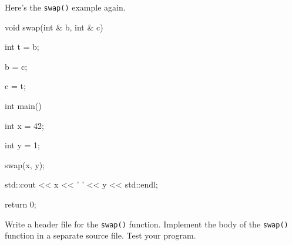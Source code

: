 Here's the \texttt{swap()} example again.



\begin{consolethree}[escapeinside=||]

void swap(int & b, int & c)

{

    int t = b;

    b = c;

    c = t;

}



int main()

{

    int x = 42;

    int y = 1;

    swap(x, y);

    std::cout << x << ' ' << y << std::endl;

    return 0;

}

\end{consolethree}



Write a header file for the \texttt{swap()} function. Implement the body of the \texttt{swap()} function in a separate source file. Test your program.


